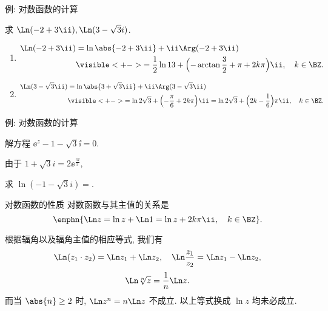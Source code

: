 \begin{frame}{例: 对数函数的计算}
	\beqskip{5pt}
	\onslide<+->
	\begin{example}
	求 $\Ln(-2+3\ii),\Ln(3-\sqrt3 i)$.
	\end{example}

	\onslide<+->
	\begin{solution}
		\begin{enumerate}
			\item
			\begin{align*}
				\Ln(-2+3\ii)&=\ln\abs{-2+3\ii}+\ii\Arg(-2+3\ii)\\
				&\visible<+->{=\frac 12\ln 13+\Bigl(-\arctan\frac 32+\pi+2k\pi\Bigr)\ii,\quad k\in\BZ.}
			\end{align*}
			\item
			\begin{align*}
				\Ln(3-\sqrt3\ii)&=\ln\abs{3+\sqrt 3\ii}+\ii\Arg(3-\sqrt 3\ii)\\
				&\visible<+->{=\ln 2\sqrt 3+\Bigl(-\frac\pi6+2k\pi\Bigr)\ii
				=\ln 2\sqrt 3+\Bigl(2k-\frac16\Bigr)\pi\ii,\quad k\in\BZ.}
			\end{align*}
		\end{enumerate}
		\vspace{-.5\baselineskip}
	\end{solution}
	\endgroup
\end{frame}


\begin{frame}{例: 对数函数的计算}
	\onslide<+->
	\begin{example}
		解方程 $\ee^z-1-\sqrt 3\ii=0$.
	\end{example}

	\onslide<+->
	\begin{solution}
		由于 $1+\sqrt 3 i=2\ee^{\frac{\pi\ii}3}$,
		\onslide<+->{因此
	\[
		z=\Ln(1+\sqrt 3\ii)=\ln 2+\Bigl(2k+\frac13\Bigr)\pi\ii,\quad k\in\BZ.\]}
		\vspace{-\baselineskip}
	\end{solution}

	\onslide<+->
	\begin{exercise}
		求 $\ln(-1-\sqrt3 i)=$\fillblankframe[2cm][3mm]{$\ln 2-\dfrac{2\pi\ii}3$}.
	\end{exercise}
\end{frame}


\begin{frame}{对数函数的性质}
	\onslide<+->
	对数函数与其主值的关系是
	\[\emphn{\Ln z=\ln z+\Ln 1=\ln z+2k\pi\ii,\quad k\in\BZ}.
	\]

	\onslide<+->
	根据辐角以及辐角主值的相应等式, 我们有
	\[\Ln(z_1\cdot z_2)=\Ln z_1+\Ln z_2,\quad
	\Ln\frac{z_1}{z_2}=\Ln z_1-\Ln z_2,
	\]
	\[\Ln \sqrt[n]z=\dfrac1n\Ln z.
	\]
	\onslide<+->
	而当 $\abs{n}\ge 2$ 时, \alert{$\Ln z^n=n\Ln z$ 不成立}.
	\onslide<+->
	以上等式换成 $\ln z$ 均未必成立.
\end{frame}


